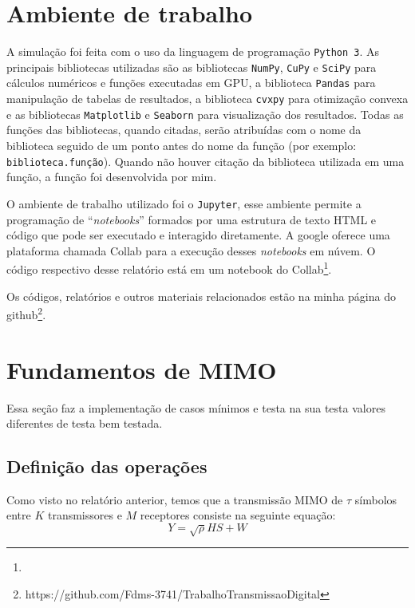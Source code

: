 \documentclass{article}
\begin{document}
\section{Ambiente de trabalho}
\label{sec:ambiente_trabalho}

A simulação foi feita com o uso da linguagem de programação \texttt{Python 3}. As principais bibliotecas utilizadas são as bibliotecas \texttt{NumPy}, \texttt{CuPy} e \texttt{SciPy} para cálculos numéricos e funções executadas em GPU, a biblioteca \texttt{Pandas} para manipulação de tabelas de resultados, a biblioteca \texttt{cvxpy} para otimização convexa e as bibliotecas \texttt{Matplotlib} e \texttt{Seaborn} para visualização dos resultados. Todas as funções das bibliotecas, quando citadas, serão atribuídas com o nome da biblioteca seguido de um ponto antes do nome da função (por exemplo: \texttt{biblioteca.função}). Quando não houver citação da biblioteca utilizada em uma função, a função foi desenvolvida por mim.

O ambiente de trabalho utilizado foi o \texttt{Jupyter}, esse ambiente permite a programação de ``\textit{notebooks}'' formados por uma estrutura de texto HTML e código que pode ser executado e interagido diretamente. A google oferece uma plataforma chamada Collab para a execução desses \textit{notebooks} em núvem. O código respectivo desse relatório está em um notebook do Collab\footnote{}.

Os códigos, relatórios e outros materiais relacionados estão na minha página do github\footnote{https://github.com/Fdms-3741/TrabalhoTransmissaoDigital}.

\section{Fundamentos de MIMO}
\label{sec:fundamentos_mimo}

Essa seção faz a implementação de casos mínimos e testa na sua testa valores diferentes de testa bem testada.

\subsection{Definição das operações}

Como visto no relatório anterior, temos que a transmissão MIMO de $\tau$ símbolos entre $K$ transmissores e $M$ receptores consiste na seguinte equação:
\begin{equation}
    Y = \sqrt\rho HS + W
    \label{eq:transmissao_mimo}
\end{equation}
\end{document}

